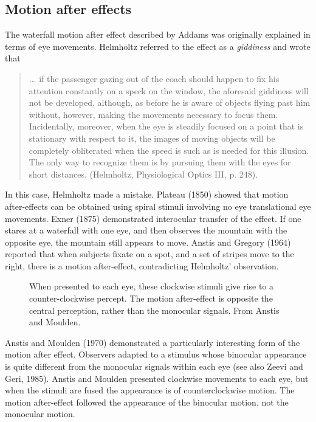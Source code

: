\subsection{Motion after effects}
The waterfall motion after effect described by Addams
was originally explained in terms of eye movements.
Helmholtz referred to the effect as a
{\em giddiness} and wrote that
\begin{quote}
... if the passenger gazing out of the coach should happen to fix his
attention constantly on a speck on the window, the aforesaid giddiness
will not be developed, although, as before he is aware of objects
flying past him without, however, making the movements necessary to
focus them.  Incidentally, moreover, when the eye is steadily focused
on a point that is stationary with respect to it, the images of moving
objects will be completely obliterated when the speed is such as is
needed for this illusion.  The only way to recognize them is by
pursuing them with the eyes for short distances. (Helmholtz,
Physiological Optics III, p. 248).
\end{quote}

In this case, Helmholtz made a mistake.
Plateau (1850) showed that motion after-effects can
be obtained using spiral stimuli involving no eye 
translational eye movements.
Exner (1875) demonstrated interocular transfer of the effect.
If one stares at a waterfall with one eye, and then
observes the mountain with the opposite eye, the mountain
still appears to move.
Anstis and Gregory (1964)
reported that when subjects fixate on a spot, and
a set of stripes move to the right, there is a motion after-effect,
contradicting Helmholtz' observation.

\begin{figure}
\centerline{
}
\caption[Motion After Effect Demonstration]{
When presented to each eye, these clockwise stimuli give
rise to a counter-clockwise percept.
The motion after-effect is opposite the central
perception, rather than the monocular signals.
From Anstis and Moulden.
}
\label{f9:mae}
\end{figure}
Anstis and Moulden (1970)
demonstrated a particularly interesting
form of the motion after effect.
Observers adapted to a stimulus whose binocular
appearance is quite different from the monocular
signals within each eye
(see also Zeevi and Geri, 1985).
Anstis and Moulden presented clockwise movements to each
eye, but when the stimuli are fused
the appearance is of counterclockwise motion.
The motion after-effect followed the appearance of the
binocular motion, not the monocular motion.

